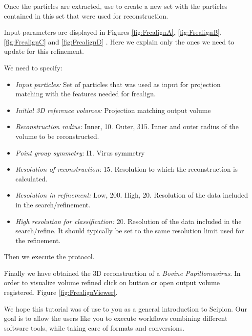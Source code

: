\documentclass[12pt]{article} %
\begin{document}
 
Once the particles are extracted, use 
to create a new set with the particles contained in this set that were used for reconstruction.

Input parameters are displayed in Figures \ref{fig:FrealignA}, \ref{fig:FrealignB}, \ref{fig:FrealignC}
and \ref{fig:FrealignD} . Here we explain only the ones we need to update
for this refinement. 



We need to specify:
\begin{itemize}
\item \textit{Input particles:} Set of particles that was used as input for projection matching 
with the features needed for frealign.
\item \textit{Initial 3D reference volumes:}  Projection matching output volume
\item \textit{Reconstruction radius:} Inner, 10. Outer, 315. Inner and outer radius of the volume to be reconstructed.
\item \textit{Point group symmetry:} I1. Virus symmetry
\item \textit{Resolution of reconstruction:} 15. Resolution to which the reconstruction is calculated.
\item \textit{Resolution in refinement:} Low, 200. High, 20. Resolution of the data included in the search/refinement.
\item \textit{High resolution for classification:} 20. Resolution of the data included in the search/refine. It should typically be set to the same resolution
limit used for the refinement.

\end{itemize}
Then we execute the protocol.


Finally we have obtained the 3D reconstruction of a \emph{Bovine Papillomavirus}.
In order to visualize volume refined click on 
button or open output volume registered.
Figure \ref{fig:FrealignViewer}.

 
We hope this tutorial was of use to you as a general introduction to Scipion.
Our goal is to allow the users like you to execute workflows combining different software tools, while taking care of formats and conversions. 





\end{document}
